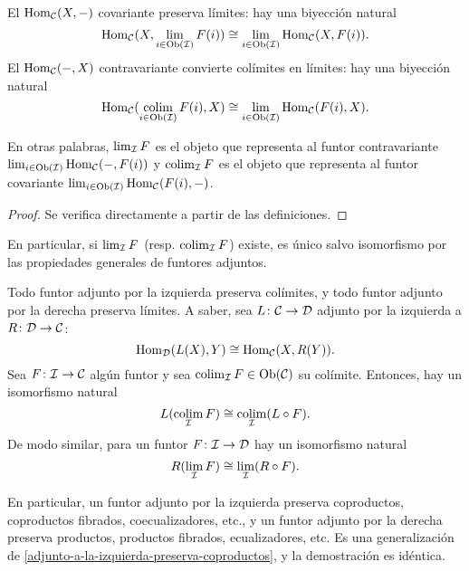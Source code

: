\documentclass{article}
\numberwithin{equation}{section}
\theoremstyle{definition}
\begin{document}
\begin{observacion}
  \label{obs:lim-colim-y-hom}
  El $\operatorname{Hom}_\mathcal{C} (X,-)$ covariante preserva límites: hay una biyección
  natural
  \[ \operatorname{Hom}_\mathcal{C} (X, \lim_{i\in \operatorname{Ob} (\mathcal{I})} F (i)) \cong
     \lim_{i\in \operatorname{Ob} (\mathcal{I})} \operatorname{Hom}_\mathcal{C} (X,F (i)). \]
   El $\operatorname{Hom}_\mathcal{C} (-, X)$ contravariante convierte colímites en límites:
   hay una biyección natural
   \[ \operatorname{Hom}_\mathcal{C} (\operatorname*{co{\lim}}_{i\in \operatorname{Ob} (\mathcal{I})} F (i), X) \cong
      \lim_{i\in \operatorname{Ob} (\mathcal{I})} \operatorname{Hom}_\mathcal{C} (F (i), X). \]

    En otras palabras, $\lim_\mathcal{I} F$ es el objeto que representa al funtor
    contravariante $\lim_{i\in \operatorname{Ob} (\mathcal{I})} \operatorname{Hom}_\mathcal{C} (-,F (i))$ y
    $\operatorname*{co{\lim}}_\mathcal{I} F$ es el objeto que representa al funtor covariante
    $\lim_{i\in \operatorname{Ob} (\mathcal{I})} \operatorname{Hom}_\mathcal{C} (F (i), -)$.

    \begin{proof}
      Se verifica directamente a partir de las definiciones.
    \end{proof}
\end{observacion}

En particular, si $\lim_\mathcal{I} F$ (resp. $\operatorname*{co{\lim}}_\mathcal{I} F$) existe, es
único salvo isomorfismo por las propiedades generales de funtores adjuntos.

\begin{observacion}
  \label{adjuntos-preservan-co-limites}
  Todo funtor adjunto por la izquierda preserva colímites, y todo funtor adjunto
  por la derecha preserva límites. A saber, sea
  $L\colon \mathcal{C} \to \mathcal{D}$ adjunto por la izquierda a
  $R\colon \mathcal{D}\to \mathcal{C}$:
  $$\operatorname{Hom}_\mathcal{D} (L (X), Y) \cong \operatorname{Hom}_\mathcal{C} (X, R (Y)).$$
  Sea $F\colon \mathcal{I} \to \mathcal{C}$ algún funtor y sea
  $\operatorname*{co{\lim}}_\mathcal{I} F \in \operatorname{Ob} (\mathcal{C})$ su colímite. Entonces, hay un
  isomorfismo natural
  $$L (\operatorname*{co{\lim}}_\mathcal{I} F) \cong \operatorname*{co{\lim}}_\mathcal{I} (L\circ F).$$
  De modo similar, para un funtor $F\colon \mathcal{I} \to \mathcal{D}$ hay un
  isomorfismo natural
  $$R (\lim_\mathcal{I} F) \cong \lim_\mathcal{I} (R\circ F).$$
\end{observacion}

En particular, un funtor adjunto por la izquierda preserva coproductos,
coproductos fibrados, coecualizadores, etc., y un funtor adjunto por la derecha
preserva productos, productos fibrados, ecualizadores, etc. Es una
generalización de \ref{adjunto-a-la-izquierda-preserva-coproductos},
y la demostración es idéntica.
\end{document}
